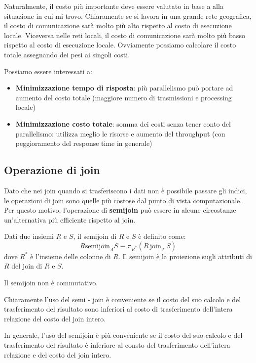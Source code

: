 Naturalmente, il costo più importante deve essere valutato in base a alla
situazione in cui mi trovo. Chiaramente se si lavora in una grande rete
geografica, il costo di comunicazione sarà molto più alto rispetto al costo di
esecuzione locale. Viceversa nelle reti locali, il costo di comunicazione sarà
molto più basso rispetto al costo di esecuzione locale. Ovviamente possiamo calcolare
il costo totale assegnando dei pesi ai singoli costi.

Possiamo essere interessati a:
\begin{itemize}
      \item \textbf{Minimizzazione tempo di risposta}: più parallelismo può portare ad
            aumento del costo totale (maggiore numero di trasmissioni e
            processing locale)
      \item \textbf{Minimizzazione costo totale}: somma dei costi senza tener conto del
            parallelismo: utilizza meglio le risorse e aumento del throughput (con
            peggioramento del response time in generale)
\end{itemize}

\subsection{Operazione di join}
Dato che nei join quando si trasferiscono i dati non è possibile passare gli indici,
le operazioni di join sono quelle più costose dal punto di vista computazionale.
Per questo motivo, l'operazione di \textbf{semijoin} può essere in alcune circostanze
un'alternativa più efficiente rispetto al join.
\begin{definizione}
      Dati due insiemi $R$ e $S$, il semijoin di $R$ e $S$ è definito come:
      \begin{equation*}
            R \text{semijoin}_A S \equiv \pi_{R^\ast}(R \, \text{join}_A \, S)
      \end{equation*}
      dove $R^\ast$ è l'insieme delle colonne di $R$. Il semijoin è la proiezione
      sugli attributi di $R$ del join di $R$ e $S$.
\end{definizione}
\begin{nota}
      Il semijoin non è commutativo.
\end{nota}
Chiaramente l'uso del semi - join è conveniente se il costo del suo calcolo e
del trasferimento del risultato sono inferiori al costo di trasferimento
dell'intera relazione del costo del join intero.

In generale, l'uso del semijoin è più conveniente se il costo del suo calcolo e
del trasferimento del risultato è inferiore al consto del trasferimento
dell'intera relazione e del costo del join intero.

